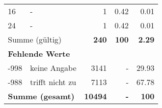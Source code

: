 \begin{longtable}{lXrrr}
     16 &
     \multicolumn{1}{X}{ -  } &


       \num{1} &
       \num[round-mode=places,round-precision=2]{0.42} &
         \num[round-mode=places,round-precision=2]{0.01} \\

     24 &
     \multicolumn{1}{X}{ -  } &


       \num{1} &
       \num[round-mode=places,round-precision=2]{0.42} &
         \num[round-mode=places,round-precision=2]{0.01} \\
     \midrule
     \multicolumn{2}{l}{Summe (gültig)} &
       \textbf{\num{240}} &
     \textbf{\num{100}} &
       \textbf{\num[round-mode=places,round-precision=2]{2.29}} \\
     \multicolumn{5}{l}{\textbf{Fehlende Werte}}\\
       -998 &
       keine Angabe &
         \num{3141} &
        - &
         \num[round-mode=places,round-precision=2]{29.93} \\
       -988 &
       trifft nicht zu &
         \num{7113} &
        - &
         \num[round-mode=places,round-precision=2]{67.78} \\
     \midrule
     \multicolumn{2}{l}{\textbf{Summe (gesamt)}} &
          \textbf{\num{10494}} &
        \textbf{-} &
        \textbf{\num{100}} \\
     \bottomrule
     \end{longtable}
     
